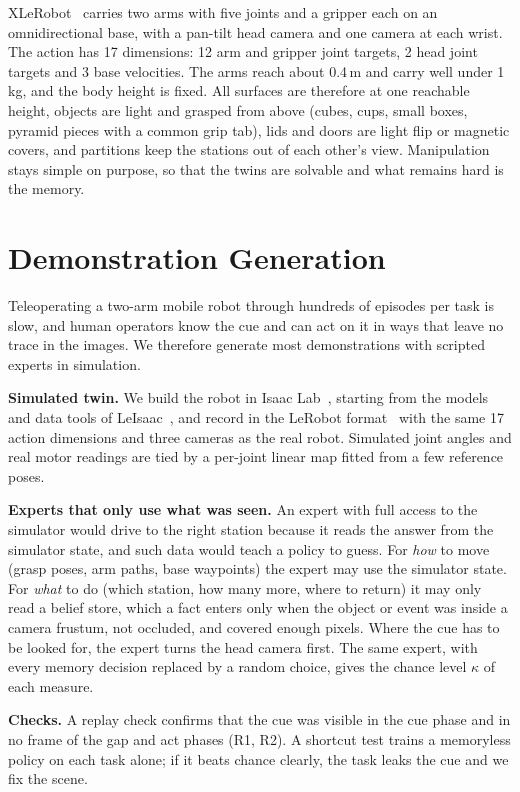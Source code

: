 \documentclass[conference]{IEEEtran}
\begin{document}
XLeRobot~\cite{wang2025xlerobot} carries two arms with five joints and a gripper each on an omnidirectional base, with a pan-tilt head camera and one camera at each wrist. The action has 17 dimensions: 12 arm and gripper joint targets, 2 head joint targets and 3 base velocities. The arms reach about 0.4\,m and carry well under 1\,kg, and the body height is fixed. All surfaces are therefore at one reachable height, objects are light and grasped from above (cubes, cups, small boxes, pyramid pieces with a common grip tab), lids and doors are light flip or magnetic covers, and partitions keep the stations out of each other's view. Manipulation stays simple on purpose, so that the twins are solvable and what remains hard is the memory.

\section{Demonstration Generation}
\label{sec:demos}

Teleoperating a two-arm mobile robot through hundreds of episodes per task is slow, and human operators know the cue and can act on it in ways that leave no trace in the images. We therefore generate most demonstrations with scripted experts in simulation.

\textbf{Simulated twin.} We build the robot in Isaac Lab~\cite{mittal2023orbit}, starting from the models and data tools of LeIsaac~\cite{leisaac2025}, and record in the LeRobot format~\cite{cadene2026lerobot} with the same 17 action dimensions and three cameras as the real robot. Simulated joint angles and real motor readings are tied by a per-joint linear map fitted from a few reference poses.

\textbf{Experts that only use what was seen.} An expert with full access to the simulator would drive to the right station because it reads the answer from the simulator state, and such data would teach a policy to guess. For \emph{how} to move (grasp poses, arm paths, base waypoints) the expert may use the simulator state. For \emph{what} to do (which station, how many more, where to return) it may only read a belief store, which a fact enters only when the object or event was inside a camera frustum, not occluded, and covered enough pixels. Where the cue has to be looked for, the expert turns the head camera first. The same expert, with every memory decision replaced by a random choice, gives the chance level $\kappa$ of each measure.

\textbf{Checks.} A replay check confirms that the cue was visible in the cue phase and in no frame of the gap and act phases (R1, R2). A shortcut test trains a memoryless policy on each task alone; if it beats chance clearly, the task leaks the cue and we fix the scene.
\end{document}
